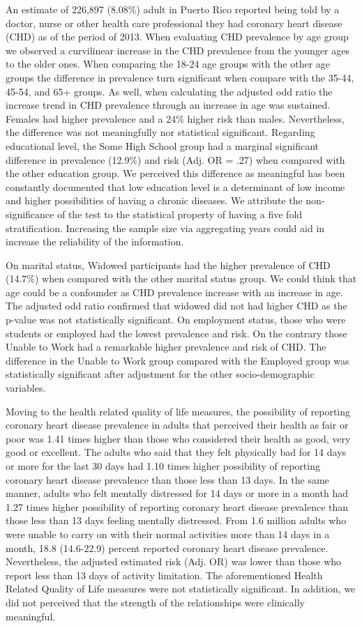 An estimate of 226,897 (8.08\%) adult in Puerto Rico reported being told by a doctor, nurse or other health care professional they had coronary heart disease (CHD) as of the period of 2013. When evaluating CHD prevalence by age group we observed a curvilinear increase in the CHD prevalence from the younger ages to the older ones.  When comparing the 18-24 age groups with the other age groups the difference in prevalence turn significant when compare with the 35-44, 45-54, and 65+ groups. As well, when calculating the adjusted odd ratio the increase trend in CHD prevalence through an increase in age was sustained.  Females had higher prevalence and a 24\% higher risk than males. Nevertheless, the difference was not meaningfully nor statistical significant. Regarding educational level, the Some High School group had a marginal significant difference in prevalence (12.9\%) and risk (Adj. OR = .27) when compared with the other education group. We perceived this difference as meaningful has been constantly documented that low education level is a determinant of low income and higher possibilities of having a chronic diseases.  We attribute the non-significance of the test to the statistical property of having a five fold stratification.  Increasing the sample size via aggregating years could aid in increase the reliability of the information.
 
On marital status, Widowed participants had the higher prevalence of CHD (14.7\%) when compared with the other marital status group.  We could think that age could be a confounder as CHD prevalence increase with an increase in age. The adjusted odd ratio confirmed that widowed did not had higher CHD as the p-value was not statistically significant. On employment status, those who were students or employed had the lowest prevalence and risk. On the contrary those Unable to Work had a remarkable higher prevalence and risk of CHD.  The difference in the Unable to Work group compared with the Employed group was statistically significant after adjustment for the other socio-demographic variables.

Moving to the health related quality of life measures, the possibility of reporting coronary heart disease prevalence in adults that perceived their health as fair or poor was 1.41 times higher than those who considered their health as good, very good or excellent. The adults who said that they felt physically bad for 14 days or more for the last 30 days had 1.10 times higher possibility of reporting coronary heart disease prevalence than those less than 13 days. In the same manner, adults who felt mentally distressed for 14 days or more in a month had 1.27 times higher possibility of reporting coronary heart disease prevalence than those less than 13 days feeling mentally distressed. From 1.6 million adults who were unable to carry on with their normal activities more than 14 days in a month, 18.8 (14.6-22.9) percent reported coronary heart disease prevalence. Nevertheless, the adjusted estimated risk (Adj. OR) was lower than those who report less than 13 days of activity limitation.  The aforementioned Health Related Quality of Life measures were not statistically significant.  In addition, we did not perceived that the strength of the relationships were clinically meaningful.


